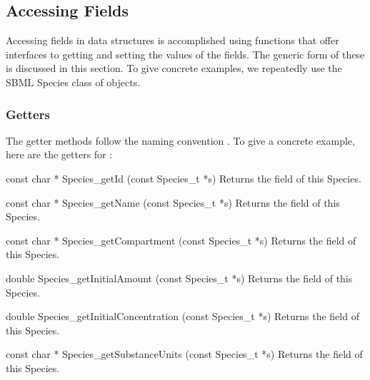 \documentclass{sbmlmanual}
\begin{document}
\subsection{Accessing Fields}
\label{sec:accessing-fields}

Accessing fields in data structures is accomplished using functions that
offer interfaces to getting and setting the values of the fields.  The
generic form of these is discussed in this section.  To give concrete
examples, we repeatedly use the SBML Species class of objects.

\subsubsection{Getters}

The getter methods follow the naming convention .  To
give a concrete example, here are the getters for :


\begin{methoddef}{const char * Species\_getId (const Species\_t *s)}
  Returns the  field of this Species.
\end{methoddef}


\begin{methoddef}{const char * Species\_getName (const Species\_t *s)}
  Returns the  field of this Species.
\end{methoddef}


\begin{methoddef}{const char * Species\_getCompartment (const Species\_t *s)}
  Returns the  field of this Species.
\end{methoddef}


\begin{methoddef}{double Species\_getInitialAmount (const Species\_t *s)}
  Returns the  field of this Species.
\end{methoddef}


\begin{methoddef}{double Species\_getInitialConcentration (const Species\_t *s)}
  Returns the  field of this Species.
\end{methoddef}


\begin{methoddef}{const char * Species\_getSubstanceUnits (const Species\_t *s)}
  Returns the  field of this Species.
\end{methoddef}
\end{document}
